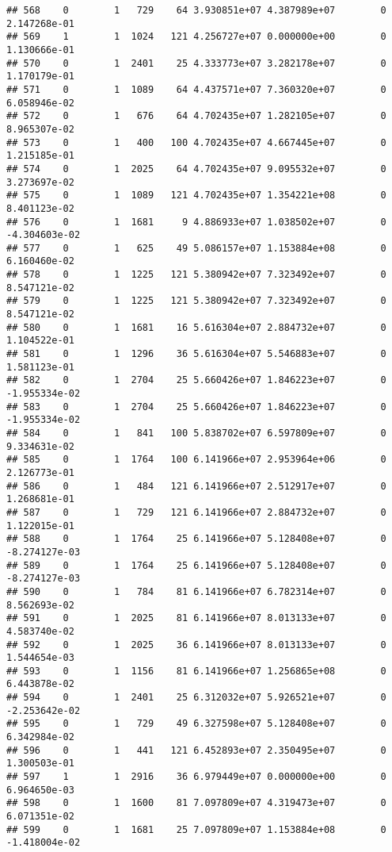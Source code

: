\documentclass[
]{article}
\begin{document}
\begin{enumerate}
\begin{verbatim}
## 568    0        1   729    64 3.930851e+07 4.387989e+07        0  2.147268e-01
## 569    1        1  1024   121 4.256727e+07 0.000000e+00        0  1.130666e-01
## 570    0        1  2401    25 4.333773e+07 3.282178e+07        0  1.170179e-01
## 571    0        1  1089    64 4.437571e+07 7.360320e+07        0  6.058946e-02
## 572    0        1   676    64 4.702435e+07 1.282105e+07        0  8.965307e-02
## 573    0        1   400   100 4.702435e+07 4.667445e+07        0  1.215185e-01
## 574    0        1  2025    64 4.702435e+07 9.095532e+07        0  3.273697e-02
## 575    0        1  1089   121 4.702435e+07 1.354221e+08        0  8.401123e-02
## 576    0        1  1681     9 4.886933e+07 1.038502e+07        0 -4.304603e-02
## 577    0        1   625    49 5.086157e+07 1.153884e+08        0  6.160460e-02
## 578    0        1  1225   121 5.380942e+07 7.323492e+07        0  8.547121e-02
## 579    0        1  1225   121 5.380942e+07 7.323492e+07        0  8.547121e-02
## 580    0        1  1681    16 5.616304e+07 2.884732e+07        0  1.104522e-01
## 581    0        1  1296    36 5.616304e+07 5.546883e+07        0  1.581123e-01
## 582    0        1  2704    25 5.660426e+07 1.846223e+07        0 -1.955334e-02
## 583    0        1  2704    25 5.660426e+07 1.846223e+07        0 -1.955334e-02
## 584    0        1   841   100 5.838702e+07 6.597809e+07        0  9.334631e-02
## 585    0        1  1764   100 6.141966e+07 2.953964e+06        0  2.126773e-01
## 586    0        1   484   121 6.141966e+07 2.512917e+07        0  1.268681e-01
## 587    0        1   729   121 6.141966e+07 2.884732e+07        0  1.122015e-01
## 588    0        1  1764    25 6.141966e+07 5.128408e+07        0 -8.274127e-03
## 589    0        1  1764    25 6.141966e+07 5.128408e+07        0 -8.274127e-03
## 590    0        1   784    81 6.141966e+07 6.782314e+07        0  8.562693e-02
## 591    0        1  2025    81 6.141966e+07 8.013133e+07        0  4.583740e-02
## 592    0        1  2025    36 6.141966e+07 8.013133e+07        0  1.544654e-03
## 593    0        1  1156    81 6.141966e+07 1.256865e+08        0  6.443878e-02
## 594    0        1  2401    25 6.312032e+07 5.926521e+07        0 -2.253642e-02
## 595    0        1   729    49 6.327598e+07 5.128408e+07        0  6.342984e-02
## 596    0        1   441   121 6.452893e+07 2.350495e+07        0  1.300503e-01
## 597    1        1  2916    36 6.979449e+07 0.000000e+00        0  6.964650e-03
## 598    0        1  1600    81 7.097809e+07 4.319473e+07        0  6.071351e-02
## 599    0        1  1681    25 7.097809e+07 1.153884e+08        0 -1.418004e-02

\end{verbatim}
\end{enumerate}
\end{document}
